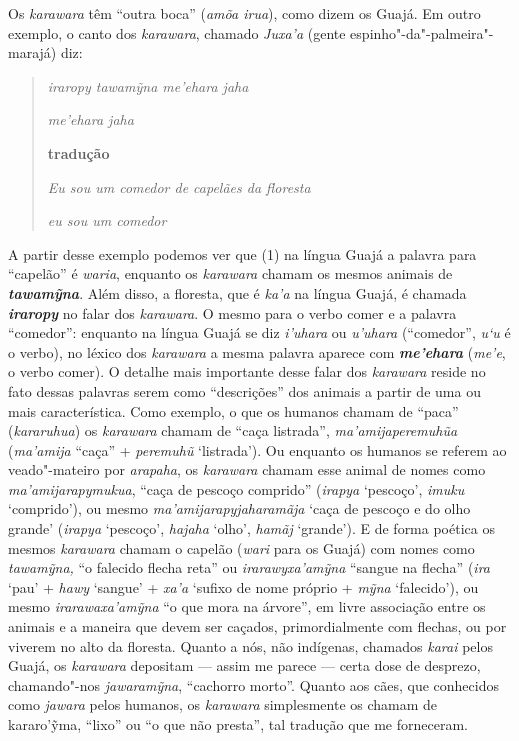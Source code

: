 Os \emph{karawara} têm ``outra boca'' (\emph{amõa irua}), como dizem os
Guajá. Em outro exemplo, o canto dos \emph{karawara}, chamado
\emph{Juxa'a} (gente espinho"-da"-palmeira"-marajá) diz:

\begin{quote}
\emph{iraropy tawamỹna me'ehara jaha }

\emph{me'ehara jaha}

\textbf{tradução}

\emph{Eu sou um comedor de capelães da floresta}

\emph{eu sou um comedor}
\end{quote}

A partir desse exemplo podemos ver que (1) na língua Guajá a palavra
para ``capelão'' é \emph{waria}, enquanto os \emph{karawara} chamam os
mesmos animais de \emph{\textbf{tawamỹna}}. Além disso, a floresta, que
é \emph{ka'a} na língua Guajá, é chamada \emph{\textbf{iraropy}} no
falar dos \emph{karawara}. O mesmo para o verbo comer e a palavra
``comedor'': enquanto na língua Guajá se diz \emph{i'uhara} ou
\emph{u'uhara} (``comedor'', \emph{u`u} é o verbo), no léxico dos
\emph{karawara} a mesma palavra aparece com \emph{\textbf{me'ehara}}
(\emph{me'e}, o verbo comer). O detalhe mais importante desse falar dos
\emph{karawara} reside no fato dessas palavras serem como ``descrições''
dos animais a partir de uma ou mais característica. Como exemplo, o que
os humanos chamam de ``paca'' (\emph{kararuhua}) os \emph{karawara}
chamam de ``caça listrada'', \emph{ma'amijaperemuhũa} (\emph{ma'amija}
``caça'' + \emph{peremuhũ} `listrada'). Ou enquanto os humanos se
referem ao veado"-mateiro por \emph{arapaha}, os \emph{karawara} chamam
esse animal de nomes como \emph{ma'amijarapymukua}, ``caça de pescoço
comprido'' (\emph{irapya} `pescoço', \emph{imuku} `comprido'), ou mesmo
\emph{ma'amijarapyjaharamãja} `caça de pescoço e do olho grande'
(\emph{irapya} `pescoço', \emph{hajaha} `olho', \emph{hamãj} `grande').
E de forma poética os mesmos \emph{karawara} chamam o capelão
(\emph{wari} para os Guajá) com nomes como \emph{tawamỹna,} ``o falecido
flecha reta'' ou \emph{irarawyxa'amỹna} ``sangue na flecha'' (\emph{ira}
`pau' + \emph{hawy} `sangue' + \emph{xa'a} `sufixo de nome próprio +
\emph{mỹna} `falecido'), ou mesmo \emph{irarawaxa'amỹna} ``o que mora na
árvore'', em livre associação entre os animais e a maneira que devem ser
caçados, primordialmente com flechas, ou por viverem no alto da
floresta. Quanto a nós, não indígenas, chamados \emph{karai} pelos
Guajá, os \emph{karawara} depositam --- assim me parece --- certa dose de
desprezo, chamando"-nos \emph{jawaramỹna}, ``cachorro morto''. Quanto aos
cães, que conhecidos como \emph{jawara} pelos humanos, os
\emph{karawara} simplesmente os chamam de kararo'ỹma, ``lixo'' ou ``o
que não presta'', tal tradução que me forneceram.

